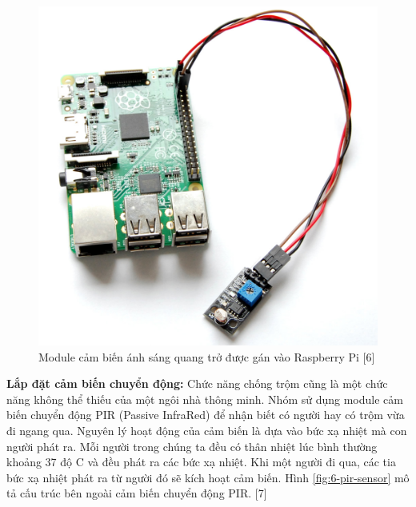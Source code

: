 \documentclass[11pt,a4paper,oneside]{book}
\begin{document}
\begin{figure}[h]
  \centering
     \includegraphics[scale=0.2]{6-light-sensor}
  \caption{Module cảm biến ánh sáng quang trở được gán vào Raspberry Pi [6]}\label{fig:6-light-sensor}
\end{figure}

\textbf{Lắp đặt cảm biến chuyển động:} Chức năng chống trộm cũng là một chức năng không thể thiếu của một ngôi nhà thông minh. Nhóm sử dụng module cảm biến chuyển động PIR (Passive InfraRed) để nhận biết có người hay có trộm vừa đi ngang qua. Nguyên lý hoạt động của cảm biến là dựa vào bức xạ nhiệt mà con người phát ra. Mỗi người trong chúng ta đều có thân nhiệt lúc bình thường khoảng 37 độ C và đều phát ra các bức xạ nhiệt. Khi một người đi qua, các tia bức xạ nhiệt phát ra từ người đó sẽ kích hoạt cảm biến. Hình \ref{fig:6-pir-sensor} mô tả cấu trúc bên ngoài cảm biến chuyển động PIR. [7]
\end{document}
